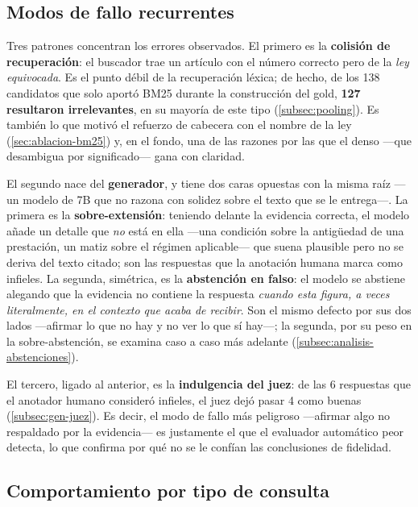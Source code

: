 \subsection{Modos de fallo recurrentes}
\label{subsec:modos-fallo}

Tres patrones concentran los errores observados. El primero es la \textbf{colisión de recuperación}: el buscador trae un artículo con el número correcto pero de la \emph{ley equivocada}. Es el punto débil de la recuperación léxica; de hecho, de los 138 candidatos que solo aportó BM25 durante la construcción del gold, \textbf{127 resultaron irrelevantes}, en su mayoría de este tipo (\ref{subsec:pooling}). Es también lo que motivó el refuerzo de cabecera con el nombre de la ley (\ref{sec:ablacion-bm25}) y, en el fondo, una de las razones por las que el denso —que desambigua por significado— gana con claridad.

El segundo nace del \textbf{generador}, y tiene dos caras opuestas con la misma raíz —un modelo de 7B que no razona con solidez sobre el texto que se le entrega—. La primera es la \textbf{sobre-extensión}: teniendo delante la evidencia correcta, el modelo añade un detalle que \emph{no} está en ella —una condición sobre la antigüedad de una prestación, un matiz sobre el régimen aplicable— que suena plausible pero no se deriva del texto citado; son las respuestas que la anotación humana marca como infieles. La segunda, simétrica, es la \textbf{abstención en falso}: el modelo se abstiene alegando que la evidencia no contiene la respuesta \emph{cuando esta figura, a veces literalmente, en el contexto que acaba de recibir}. Son el mismo defecto por sus dos lados —afirmar lo que no hay y no ver lo que sí hay—; la segunda, por su peso en la sobre-abstención, se examina caso a caso más adelante (\ref{subsec:analisis-abstenciones}).

El tercero, ligado al anterior, es la \textbf{indulgencia del juez}: de las 6 respuestas que el anotador humano consideró infieles, el juez dejó pasar 4 como buenas (\ref{subsec:gen-juez}). Es decir, el modo de fallo más peligroso —afirmar algo no respaldado por la evidencia— es justamente el que el evaluador automático peor detecta, lo que confirma por qué no se le confían las conclusiones de fidelidad.

\subsection{Comportamiento por tipo de consulta}
\label{subsec:errores-por-tipo}

